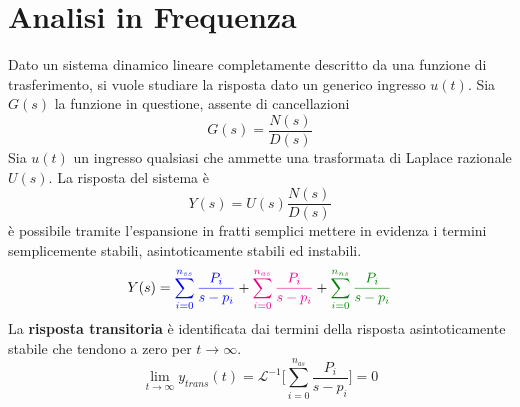 \documentclass[10pt, letterpaper]{report}
\begin{document}
\section{Analisi in Frequenza}
Dato un sistema dinamico lineare completamente descritto da una funzione di trasferimento, si vuole studiare la risposta dato un generico ingresso $u(t)$. Sia $G(s)$ la funzione in questione, assente di cancellazioni 
$$ G(s)=\frac{N(s)}{D(s)}$$
Sia $u(t)$ un ingresso qualsiasi che ammette una trasformata di Laplace razionale $U(s)$. La risposta del sistema è 
$$Y(s)=U(s)\frac{N(s)}{D(s)}$$
è possibile tramite l'espansione in fratti semplici mettere in evidenza i termini \color{blue}semplicemente stabili\color{black}, \color{magenta}asintoticamente stabili \color{black}  ed  \color{darkgreen}instabili\color{black}.
$$Y(s)=\color{blue}\sum_{i=0}^{n_{ss}}\frac{P_i}{s-p_i}\color{black}+
\color{magenta}\sum_{i=0}^{n_{as}}\frac{P_i}{s-p_i}\color{black}+
\color{darkgreen}\sum_{i=0}^{n_{ns}}\frac{P_i}{s-p_i}\color{black}$$
La \textbf{risposta transitoria} è identificata dai termini della risposta asintoticamente stabile che tendono a zero per $t\rightarrow \infty$.
$$\lim_{t\rightarrow \infty}y_{trans}(t)=\mathcal{L}^{-1}\Big[    \sum_{i=0}^{n_{as}}\frac{P_i}{s-p_i} \Big]=0$$
\end{document}
